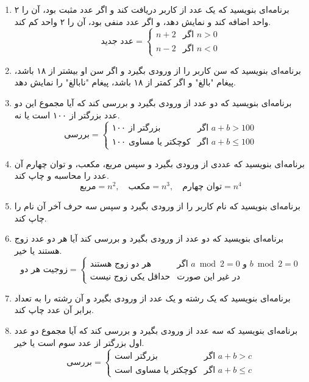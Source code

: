 \documentclass[a4paper,12pt]{article}
\begin{document}
\begin{enumerate}
		\item برنامه‌ای بنویسید که یک عدد از کاربر دریافت کند و اگر عدد مثبت بود، آن را ۲ واحد اضافه کند و نمایش دهد، و اگر عدد منفی بود، آن را ۲ واحد کم کند.
		\[
		\text{عدد جدید} = 
		\begin{cases} 
			n + 2 & \text{اگر } n > 0 \\ 
			n - 2 & \text{اگر } n < 0 
		\end{cases} 
		\]
		\item برنامه‌ای بنویسید که سن کاربر را از ورودی بگیرد و اگر سن او بیشتر از ۱۸ باشد، پیغام "بالغ" و اگر کمتر از ۱۸ باشد، پیغام "نابالغ" را نمایش دهد.
		\item برنامه‌ای بنویسید که دو عدد از ورودی بگیرد و بررسی کند که آیا مجموع این دو عدد بزرگتر از ۱۰۰ است یا نه.
		\[
		\text{بررسی} = 
		\begin{cases} 
			\text{بزرگتر از ۱۰۰} & \text{اگر } a + b > 100 \\ 
			\text{کوچکتر یا مساوی ۱۰۰} & \text{اگر } a + b \leq 100 
		\end{cases} 
		\]
		\item برنامه‌ای بنویسید که عددی از ورودی بگیرد و سپس مربع، مکعب، و توان چهارم آن عدد را محاسبه و چاپ کند.
		\[
		\text{مربع} = n^2, \quad 
		\text{مکعب} = n^3, \quad 
		\text{توان چهارم} = n^4
		\]
		\item برنامه‌ای بنویسید که نام کاربر را از ورودی بگیرد و سپس سه حرف آخر آن نام را چاپ کند.
		\item برنامه‌ای بنویسید که دو عدد از ورودی بگیرد و بررسی کند آیا هر دو عدد زوج هستند یا خیر.
		\[
		\text{زوجیت هر دو} = 
		\begin{cases} 
			\text{هر دو زوج هستند} & \text{اگر } a \bmod 2 = 0 \text{ و } b \bmod 2 = 0 \\ 
			\text{حداقل یکی زوج نیست} & \text{در غیر این صورت} 
		\end{cases} 
		\]
		\item برنامه‌ای بنویسید که یک رشته و یک عدد از ورودی بگیرد و آن رشته را به تعداد برابر آن عدد چاپ کند.
		\item برنامه‌ای بنویسید که سه عدد از ورودی بگیرد و بررسی کند که آیا مجموع دو عدد اول بزرگتر از عدد سوم است یا خیر.
		\[
		\text{بررسی} = 
		\begin{cases} 
			\text{بزرگتر است} & \text{اگر } a + b > c \\ 
			\text{کوچکتر یا مساوی است} & \text{اگر } a + b \leq c 
		\end{cases} 
		\]
		
		
	\end{enumerate}
	
\end{document}
